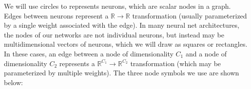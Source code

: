 \documentclass[12pt,letterpaper]{article}
\begin{document}
We will use circles to represents neurons, which are scalar nodes in a graph. Edges between neurons represent a $\mathbb{R} \rightarrow \mathbb{R}$ transformation (usually parameterized by a single weight associated with the edge). In many neural net architectures, the nodes of our networks are not individual neurons, but instead may be multidimensional vectors of neurons, which we will draw as squares or rectangles. In these cases, an edge between a node of dimensionality $C_1$ and a node of dimensionality $C_2$ represents a $\mathbb{R}^{C_1} \rightarrow \mathbb{R}^{C_2}$ transformation (which may be parameterized by multiple weights). The three node symbols we use are shown below:
\begin{figure}[h!]
    \def\layerheight{1.2}
    \def\neuronrad{0.15}
    \begin{minipage}{0.32\linewidth}
    \centering
    \end{minipage}
    \begin{minipage}{0.32\linewidth}
    \centering
    \end{minipage}
    \begin{minipage}{0.32\linewidth}
    \centering
    \end{minipage}
\end{figure}
\end{document}
